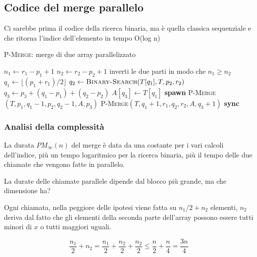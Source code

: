 \subsection{Codice del merge parallelo}\label{codice-del-merge-parallelo}

Ci sarebbe prima il codice della ricerca binaria, ma è quella classica
sequenziale e che ritorna l'indice dell'elemento in tempo O(log n)

\begin{breakablealgorithm}
	\caption{\textsc{P-Merge}: merge di due array parallelizzato}
	\begin{algorithmic}[1]
    \State $n_1 \gets r_1 - p_1 +1$
    \State $n_2 \gets r_2 - p_2 +1$
        \State inverti le due parti in modo che $n_1 \geq n_2$
    \EndIf
        \State \Return
    \EndIf
    \State $q_1 \gets \lfloor (p_1 + r_1) / 2 \rfloor$ 
    \State $q_2 \gets \textsc{Binary-Search}(T[q_1], T, p_2, r_2)$
    \State $q_3 \gets p_3 + (q_1 - p_1) + (q_2 - p_2)$ 
    \State $A[q_3] \gets T[q_1]$
    \State \textbf{spawn } \textsc{P-Merge}$(T, p_1, q_1 -1, p_2, q_2 -1, A, p_3)$ 
    \State \textsc{P-Merge}$(T, q_1 +1, r_1, q_2, r_2, A, q_3+1)$
    \State \textbf{sync}
\EndFunction
\end{algorithmic}
\end{breakablealgorithm}

\subsubsection{Analisi della complessità}\label{analisi-della-complessituxe0}

La durata $PM_\infty(n)$ del merge è data da una costante per i vari calcoli dell'indice, più un tempo logaritmico per la ricerca binaria, più il tempo delle due chiamate che vengono fatte in parallelo.

La durate delle chiamate parallele dipende dal blocco più grande, ma che dimensione ha?

Ogni chiamata, nella peggiore delle ipotesi viene fatta su $n_1/2 + n_2$ elementi, $n_2$ deriva dal fatto che gli elementi della seconda parte dell'array possono essere tutti minori di $x$ o tutti maggiori uguali.

$$\frac{n_1}{2} +n_2 = \frac{n_1}{2} + \frac{n_2}{2} + \frac{n_2}{2} \leq \frac{n}{2} + \frac{n}{4} = \frac{3n}{4}$$

